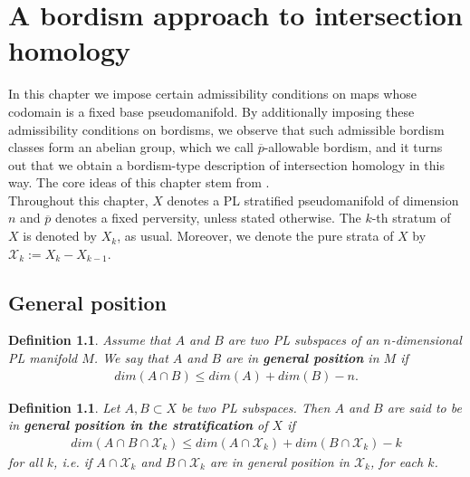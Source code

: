 \documentclass{scrreprt}
\newtheorem{definition}[prop]{Definition}
\begin{document}
\chapter{A bordism approach to intersection homology}\label{IOmega}
In this chapter we impose certain admissibility conditions on maps whose codomain is a fixed base pseudomanifold. By additionally imposing these admissibility conditions on bordisms, we observe that such admissible bordism classes form an abelian group, which we call $\overline{p}$-allowable bordism, and it turns out that we obtain a bordism-type description of intersection homology in this way. The core ideas of this chapter stem from \cite{comezana}. \\
Throughout this chapter, $X$ denotes a PL stratified pseudomanifold of dimension $n$ and $\overline{p}$ denotes a fixed perversity, unless stated otherwise. The $k$-th stratum of $X$ is denoted by $X_k$, as usual. Moreover, we denote the pure strata of $X$ by $\mathcal{X}_k:= X_k - X_{k-1}$.

\section{General position}

\begin{definition}
Assume that $A$ and $B$ are two PL subspaces of an $n$-dimensional PL manifold $M$. We say that $A$ and $B$ are in \textbf{general position} in $M$ if 
\begin{align*}
dim(A \cap B) \leq dim(A) + dim(B) - n.
\end{align*}
\end{definition}

\begin{definition}
Let $A,B \subset X$ be two PL subspaces. Then $A$ and $B$ are said to be in \textbf{general position in the stratification } of $X$ if
\begin{align*}
dim(A \cap B \cap \mathcal{X}_k) \leq dim(A \cap \mathcal{X}_k) + dim(B \cap \mathcal{X}_k) -k
\end{align*}
for all $k$, i.e. if $A \cap \mathcal{X}_k$ and $B \cap \mathcal{X}_k$ are in general position in $\mathcal{X}_k$, for each $k$.
\end{definition}
\end{document}
